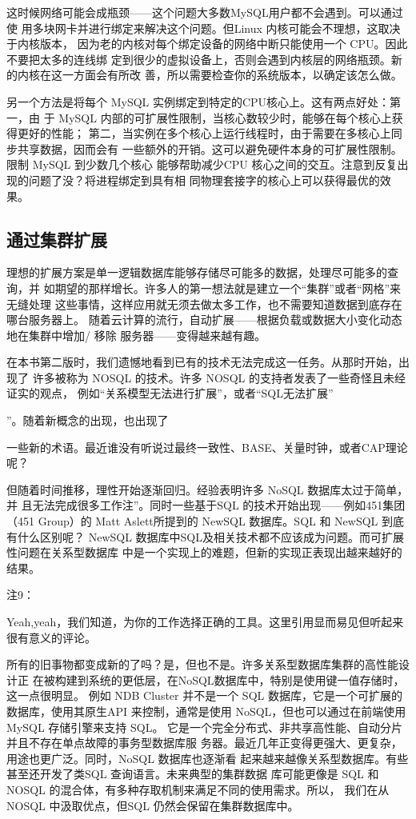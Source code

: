 这时候网络可能会成瓶颈——这个问题大多数MySQL用户都不会遇到。可以通过使
用多块网卡并进行绑定来解决这个问题。但Linux 内核可能会不理想，这取决于内核版本，
因为老的内核对每个绑定设备的网络中断只能使用一个 CPU。因此不要把太多的连线绑
定到很少的虚拟设备上，否则会遇到内核层的网络瓶颈。新的内核在这一方面会有所改
善，所以需要检查你的系统版本，以确定该怎么做。

另一个方法是将每个 MySQL 实例绑定到特定的CPU核心上。这有两点好处：第一，由
于 MySQL 内部的可扩展性限制，当核心数较少时，能够在每个核心上获得更好的性能；
第二，当实例在多个核心上运行线程时，由于需要在多核心上同步共享数据，因而会有
一些额外的开销。这可以避免硬件本身的可扩展性限制。限制 MySQL 到少数几个核心
能够帮助减少CPU 核心之间的交互。注意到反复出现的问题了没？将进程绑定到具有相
同物理套接字的核心上可以获得最优的效果。

\subsection{通过集群扩展}
理想的扩展方案是单一逻辑数据库能够存储尽可能多的数据，处理尽可能多的查询，并
如期望的那样增长。许多人的第一想法就是建立一个“集群”或者“网格”来无缝处理
这些事情，这样应用就无须去做太多工作，也不需要知道数据到底存在哪台服务器上。
随着云计算的流行，自动扩展——根据负载或数据大小变化动态地在集群中增加/ 移除
服务器——变得越来越有趣。

在本书第二版时，我们遗憾地看到已有的技术无法完成这一任务。从那时开始，出现了
许多被称为 NOSQL 的技术。许多 NOSQL 的支持者发表了一些奇怪且未经证实的观点，
例如“关系模型无法进行扩展”，或者“SQL无法扩展”

”。随着新概念的出现，也出现了

一些新的术语。最近谁没有听说过最终一致性、BASE、关量时钟，或者CAP理论呢？

但随着时间推移，理性开始逐渐回归。经验表明许多 NoSQL 数据库太过于简单，并
且无法完成很多工作注”。同时一些基于SQL 的技术开始出现——例如451集团（451
Group）的 Matt Aslett所提到的 NewSQL 数据库。SQL 和 NewSQL 到底有什么区别呢？
NewSQL 数据库中SQL及相关技术都不应该成为问题。而可扩展性问题在关系型数据库
中是一个实现上的难题，但新的实现正表现出越来越好的结果。

注9：

Yeah,yeah，我们知道，为你的工作选择正确的工具。这里引用显而易见但听起来很有意义的评论。

所有的旧事物都变成新的了吗？是，但也不是。许多关系型数据库集群的高性能设计正
在被构建到系统的更低层，在NoSQL数据库中，特别是使用键一值存储时，这一点很明显。
例如 NDB Cluster 并不是一个 SQL 数据库，它是一个可扩展的数据库，使用其原生API
来控制，通常是使用 NoSQL，但也可以通过在前端使用 MySQL 存储引擎来支持 SQL。
它是一个完全分布式、非共享高性能、自动分片并且不存在单点故障的事务型数据库服
务器。最近几年正变得更强大、更复杂，用途也更广泛。同时，NoSQL 数据库也逐渐看
起来越来越像关系型数据库。有些甚至还开发了类SQL 查询语言。未来典型的集群数据
库可能更像是 SQL 和 NOSQL 的混合体，有多种存取机制来满足不同的使用需求。所以，
我们在从 NOSQL 中汲取优点，但SQL 仍然会保留在集群数据库中。

